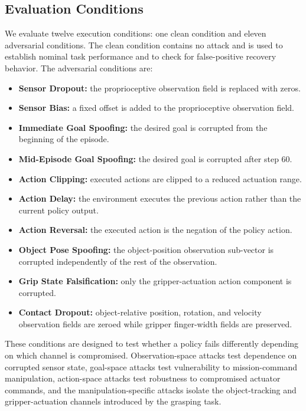 \documentclass[conference]{IEEEtran}
\begin{document}
\subsection{Evaluation Conditions}

We evaluate twelve execution conditions: one clean condition and eleven adversarial
conditions. The clean condition contains no attack and is used to establish nominal
task performance and to check for false-positive recovery behavior. The adversarial
conditions are:

\begin{itemize}
    \item \textbf{Sensor Dropout:} the proprioceptive observation field is replaced
    with zeros.
    \item \textbf{Sensor Bias:} a fixed offset is added to the proprioceptive
    observation field.
    \item \textbf{Immediate Goal Spoofing:} the desired goal is corrupted from the
    beginning of the episode.
    \item \textbf{Mid-Episode Goal Spoofing:} the desired goal is corrupted after
    step 60.
    \item \textbf{Action Clipping:} executed actions are clipped to a reduced
    actuation range.
    \item \textbf{Action Delay:} the environment executes the previous action rather
    than the current policy output.
    \item \textbf{Action Reversal:} the executed action is the negation of the policy
    action.
    \item \textbf{Object Pose Spoofing:} the object-position observation sub-vector is
    corrupted independently of the rest of the observation.
    \item \textbf{Grip State Falsification:} only the gripper-actuation action
    component is corrupted.
    \item \textbf{Contact Dropout:} object-relative position, rotation, and velocity
    observation fields are zeroed while gripper finger-width fields are preserved.
\end{itemize}

These conditions are designed to test whether a policy fails differently depending on
which channel is compromised. Observation-space attacks test dependence on corrupted
sensor state, goal-space attacks test vulnerability to mission-command manipulation,
action-space attacks test robustness to compromised actuator commands, and the
manipulation-specific attacks isolate the object-tracking and gripper-actuation
channels introduced by the grasping task.
\end{document}

